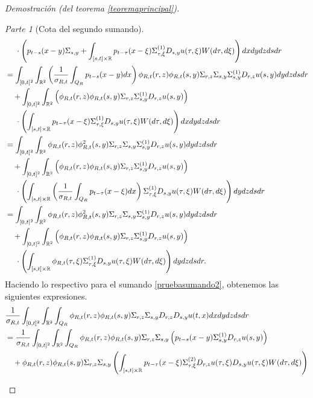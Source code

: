\documentclass[letterpaper,twoside,12pt]{book}
\newcommand{\R}{\mathbb{R}}
\newcommand{\1}{\mathds{1}}
\theoremstyle{definition}
\theoremstyle{definition}
\theoremstyle{remark}
\newtheorem{proofpart}{Parte}
\theoremstyle{definition}
\theoremstyle{definition}
\theoremstyle{definition}
\theoremstyle{definition}
\theoremstyle{definition}
\begin{document}
\begin{proof}[Demostración (del teorema \ref{teoremaprincipal})]
\begin{proofpart}[Cota del segundo sumando]
\begin{align}
      & \ \ \ \ \cdot\left(p_{t-s}(x-y)\Sigma_{s,y}+ \int_{[s,t]\times\R} p_{t-\tau}(x-\xi)\Sigma^{(1)}_{\tau,\xi}D_{s,y}u(\tau,\xi)W(d\tau,d\xi)\right)dx dy dz ds dr\notag\\
      &=\int_{[0,t]^2}\int_{\R^2}\left(\frac{1}{\sigma_{R,t}}\int_{Q_R}p_{t-s}(x-y)dx\right)\phi_{R,t}(r,z)\phi_{R,t}(s,y)\Sigma_{r,z}\Sigma_{s,y}\Sigma^{(1)}_{s,y}D_{r,z}u(s,y)dy dz ds dr\notag\\
      & \ \ \ + \int_{[0,t]^2}\int_{\R^2}\left(\phi_{R,t}(r,z)\phi_{R,t}(s,y)\Sigma_{r,z}\Sigma^{(1)}_{s,y}D_{r,z}u(s,y)\right)\notag\\
      &\ \ \ \ \cdot\left(\int_{[s,t]\times\R} p_{t-\tau}(x-\xi)\Sigma^{(1)}_{\tau,\xi}D_{s,y}u(\tau,\xi)W(d\tau,d\xi)\right)dx dy dz ds dr\notag\\
      &=\int_{[0,t]^2}\int_{\R^2}\phi_{R,t}(r,z)\phi_{R,t}^2(s,y)\Sigma_{r,z}\Sigma_{s,y}\Sigma^{(1)}_{s,y}D_{r,z}u(s,y)dy dz ds dr\notag\\
      & \ \ \ + \int_{[0,t]^2}\int_{\R^2}\left(\phi_{R,t}(r,z)\phi_{R,t}(s,y)\Sigma_{r,z}\Sigma^{(1)}_{s,y}D_{r,z}u(s,y)\right)\notag\\
      &\ \ \ \ \cdot\left(\int_{[s,t]\times\R} \left(\frac{1}{\sigma_{R,t}}\int_{Q_R}p_{t-\tau}(x-\xi)dx\right)\Sigma^{(1)}_{\tau,\xi}D_{s,y}u(\tau,\xi)W(d\tau,d\xi)\right)dy dz ds dr\notag\\
      &=\int_{[0,t]^2}\int_{\R^2}\phi_{R,t}(r,z)\phi_{R,t}^2(s,y)\Sigma_{r,z}\Sigma_{s,y}\Sigma^{(1)}_{s,y}D_{r,z}u(s,y)dy dz ds dr\label{pruebasumando3}\\
      &\ \ \ + \int_{[0,t]^2}\int_{\R^2}\left(\phi_{R,t}(r,z)\phi_{R,t}(s,y)\Sigma_{r,z}\Sigma^{(1)}_{s,y}D_{r,z}u(s,y)\right)\notag\\
      &\ \ \ \ \cdot\left(\int_{[s,t]\times\R} \phi_{R,t}(\tau,\xi)\Sigma^{(1)}_{\tau,\xi}D_{s,y}u(\tau,\xi)W(d\tau,d\xi)\right)dy dz ds dr\label{pruebasumando4}.
   \end{align}
Haciendo lo respectivo para el sumando \eqref{pruebasumando2}, obtenemos las siguientes expresiones.
\begin{align}
   &\frac{1}{\sigma_{R,t}}\int_{[0,t]^2}\int_{\R^2}\int_{Q_R}\phi_{R,t}(r,z)\phi_{R,t}(s,y)\Sigma_{r,z}\Sigma_{s,y}D_{r,z}D_{s,y}u(t,x)dx dy dz ds dr\notag\\
   &=\frac{1}{\sigma_{R,t}}\int_{[0,t]^2}\int_{\R^2}\int_{Q_R}\phi_{R,t}(r,z)\phi_{R,t}(s,y)\Sigma_{r,z}\Sigma_{s,y}\left( p_{t-s}(x-y)\Sigma^{(1)}_{s,y}D_{r,z}u(s,y)\right)\notag\\
   &\ \ \ +\phi_{R,t}(r,z)\phi_{R,t}(s,y)\Sigma_{r,z}\Sigma_{s,y}\left(\int_{[s,t]\times \R} p_{t-\tau}(x-\xi)\Sigma^{(2)}_{\tau,\xi}D_{r,z}u(\tau,\xi)D_{s,y}u(\tau,\xi)W(d\tau,d\xi)\right)\notag\\

\end{align}
\end{proofpart}
\end{proof}
\end{document}

